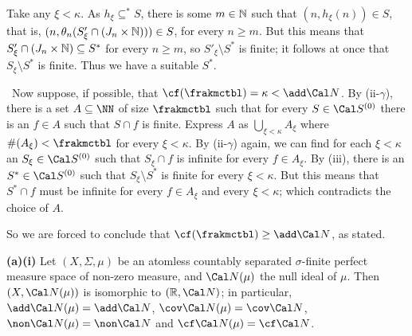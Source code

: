 {Take any $\xi<\kappa$.   As $h_{\xi}\subseteq^*S$, there is some
$m\in\Bbb N$ such that $(n,h_{\xi}(n))\in S$, that is,
$(n,\theta_n(S'_{\xi}\cap(J_n\times\Bbb N)))\in S$, for every $n\ge m$.
But this means that $S'_{\xi}\cap(J_n\times\Bbb N)\subseteq S^*$ for
every $n\ge m$, so $S'_{\xi}\setminus S^*$ is finite;  it follows at
once that $S_{\xi}\setminus S^*$ is finite.   Thus we have a suitable
$S^*$.\ \Qed

\medskip

 \Quer\ Now suppose, if possible, that
$\cf(\frakmctbl)=\kappa<\add\Cal N$.   By (ii-$\gamma$), there is a
set $A\subseteq\NN$ of
size $\frakmctbl$ such that for every $S\in\Cal S^{(0)}$ there is an
$f\in A$ such that $S\cap f$ is finite.   Express $A$ as
$\bigcup_{\xi<\kappa}A_{\xi}$ where $\#(A_{\xi})<\frakmctbl$ for every
$\xi<\kappa$.   By (ii-$\gamma$) again, we can find for each $\xi<\kappa$ an
$S_{\xi}\in\Cal S^{(0)}$ such that $S_{\xi}\cap f$ is infinite for every
$f\in A_{\xi}$.   By (iii), there is an $S^*\in\Cal S^{(0)}$ such that
$S_{\xi}\setminus S^*$ is finite for every $\xi<\kappa$.   But this
means that $S^*\cap f$ must be infinite for every $f\in A_{\xi}$ and
every $\xi<\kappa$;  which contradicts the choice of $A$.\ \Bang

So we are forced to conclude that $\cf(\frakmctbl)\ge\add\Cal N$, as
stated.
}%

 {\bf (a)(i)} Let $(X,\Sigma,\mu)$ be an atomless countably
separated $\sigma$-finite
perfect measure space of non-zero measure,
and $\Cal N(\mu)$ the null ideal of $\mu$.   Then
$(X,\Cal N(\mu))$ is isomorphic to $(\Bbb R,\Cal N)$;  in particular,
$\add\Cal N(\mu)=\add\Cal N$, $\cov\Cal N(\mu)=\cov\Cal N$,
$\non\Cal N(\mu)=\non\Cal N$ and $\cf\Cal N(\mu)=\cf\Cal N$.

